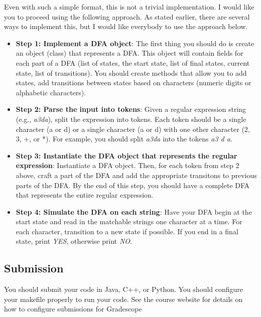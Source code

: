 \documentclass[11pt]{article}
\begin{document}
Even with such a simple format, this is not a trivial implementation. I would like you to proceed using the following approach. As stated earlier, there are several ways to implement this, but I would like everybody to use the approach below.

\begin{itemize}
	\item \textbf{Step 1: Implement a DFA object}: The first thing you should do is create an object (class) that represents a DFA. This object will contain fields for each part of a DFA (list of states, the start state, list of final states, current state, list of transitions). You should create methods that allow you to add states, add transitions between states based on characters (numeric digits or alphabetic characters). 
	\item \textbf{Step 2: Parse the input into tokens}: Given a regular expression string (e.g., \emph{a3da}), split the expression into tokens. Each token should be a single character (a or d) or a single character (a or d) with one other character (2, 3, +, or *). For example, you should split \emph{a3da} into the tokens \emph{a3 d a}. 
	\item \textbf{Step 3: Instantiate the DFA object that represents the regular expression}: Instantiate a DFA object. Then, for each token from step 2 above, craft a part of the DFA and add the appropriate transitons to previous parts of the DFA. By the end of this step, you should have a complete DFA that represents the entire regular expression.
	\item \textbf{Step 4: Simulate the DFA on each string}: Have your DFA begin at the start state and read in the matchable strings one character at a time. For each character, transition to a new state if possible. If you end in a final state, print \emph{YES}, otherwise print \emph{NO}.
\end{itemize}

\subsection*{Submission}

You should submit your code in Java, C++, or Python. You should configure your makefile properly to run your code. See the course website for details on how to configure submissions for Gradescope
\end{document}
